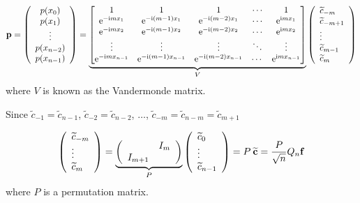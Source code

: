 \documentclass[12pt,a4paper]{article}
\begin{document}
\[
\mathbf{p} = \left(
\begin{array}{c}
p(x_0) \\
p(x_1) \\
\vdots \\
p(x_{n-2}) \\
p(x_{n-1})
\end{array}
\right)
=
\underbrace{\begin{bmatrix}
1 & 1 & 1&  \ensuremath{\cdots} & 1 \\
{\rm e}^{-{\rm i}m x_1} & {\rm e}^{-{\rm i}(m-1) x_1} &  {\rm e}^{-{\rm i}(m-2) x_1} & \ensuremath{\cdots} & {\rm e}^{{\rm i} m x_1} \\
{\rm e}^{-{\rm i}m x_2} & {\rm e}^{-{\rm i}(m-1) x_2} &  {\rm e}^{-{\rm i}(m-2) x_2} & \ensuremath{\cdots} & {\rm e}^{{\rm i} m x_2} \\
\ensuremath{\vdots} & \ensuremath{\vdots} & \ensuremath{\vdots} & \ensuremath{\ddots} & \ensuremath{\vdots} \\
{\rm e}^{-{\rm i}m x_{n-1}}& {\rm e}^{-{\rm i}(m-1)x_{n-1}}& {\rm e}^{-{\rm i}(m-2)x_{n-1}}& \cdots & {\rm e}^{{\rm i}m x_{n-1}}
\end{bmatrix}}_{V} 
\left(
\begin{array}{l}
\widetilde{c}_{-m} \\
\widetilde{c}_{-m+1} \\
\vdots \\
\widetilde{c}_{m-1} \\
\widetilde{c}_{m}
\end{array}
\right)
\]
where $V$ is known as the Vandermonde matrix.

Since $\widetilde{c}_{-1} = \widetilde{c}_{n-1}$, $\widetilde{c}_{-2} = \widetilde{c}_{n-2}$, $\ldots$, $\widetilde{c}_{-m} = \widetilde{c}_{n-m} = \widetilde{c}_{m+1}$

\[
\left(
\begin{array}{l}
\widetilde{c}_{-m} \\
\vdots \\
\widetilde{c}_{m}
\end{array}
\right) = 
\underbrace{\left(
\begin{array}{c c}
   & I_{m} \\
I_{m+1} & 
\end{array}
\right)}_{P}
\left(
\begin{array}{l}
\widetilde{c}_{0} \\
\vdots \\
\widetilde{c}_{n-1}
\end{array}
\right) = P\: \widetilde{\mathbf{c}} = \frac{P}{\sqrt{n}}Q_{n}\mathbf{f}
\]
where $P$ is a permutation matrix.
\end{document}
